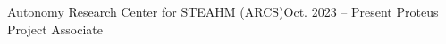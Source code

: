 \resumeSubheading
      {Autonomy Research Center for STEAHM (ARCS)}{Oct. 2023 -- Present}
      {Proteus Project Associate}{}
      \resumeItemListStart
        \resumeItem{}
        \resumeItem{}
        \resumeItem{}
    \resumeItemListEnd